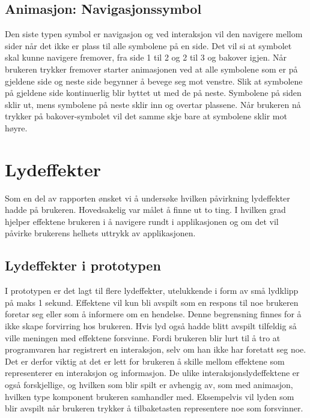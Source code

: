 { 
 
 
\subsection{Animasjon: Navigasjonssymbol} 
 
 
Den siste typen symbol er navigasjon og ved interaksjon vil den navigere mellom sider når det ikke er plass til alle symbolene på en side. Det vil si at symbolet skal kunne navigere fremover, fra side 1 til 2 og 2 til 3 og bakover igjen. Når brukeren trykker fremover starter animasjonen ved at alle symbolene som er på gjeldene side og neste side begynner å bevege seg mot venstre. Slik at symbolene på gjeldene side kontinuerlig blir byttet ut med de på neste. Symbolene på siden sklir ut, mens symbolene på neste sklir inn og overtar plassene. Når brukeren nå trykker på bakover-symbolet vil det samme skje bare at symbolene sklir mot høyre. 
 
 
\section{Lydeffekter} 
 
 
Som en del av rapporten ønsket vi å undersøke hvilken påvirkning lydeffekter hadde på brukeren. Hovedsakelig var målet å finne ut to ting. I hvilken grad hjelper effektene brukeren i å navigere rundt i applikasjonen og om det vil påvirke brukerens helhets uttrykk av applikasjonen.  
 
 
\subsection{Lydeffekter i prototypen} 
 
 
I prototypen er det lagt til flere lydeffekter, utelukkende i form av små lydklipp på maks 1 sekund. Effektene vil kun bli avspilt som en respons til noe brukeren foretar seg eller som å informere om en hendelse. Denne begrensning finnes for å ikke skape forvirring hos brukeren. Hvis lyd også hadde blitt avspilt tilfeldig så ville meningen med effektene forsvinne. Fordi brukeren blir lurt til å tro at programvaren har registrert en interaksjon, selv om han ikke har foretatt seg noe. Det er derfor viktig at det er lett for brukeren å skille mellom effektene som representerer en interaksjon og informasjon. De ulike interaksjonslydeffektene er også forskjellige, og hvilken som blir spilt er avhengig av,  som med animasjon,  hvilken type komponent brukeren samhandler med. Eksempelvis vil lyden som blir avspilt når brukeren trykker å tilbaketasten representere noe som forsvinner.  
 
}
